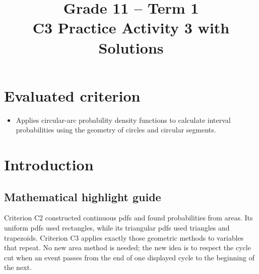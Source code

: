 
\title{Grade 11 -- Term 1 \\ C3 Practice Activity 3 with Solutions}
\author{}
\date{}


	\maketitle
	\setcounter{tocdepth}{1}
	\setcounter{secnumdepth}{2}
	\label{toc}
	\tableofcontents
	
	\section*{Evaluated criterion}
	\begin{itemize}
		\item [\textbf{C3}] Applies circular-arc probability density functions to calculate interval probabilities using the geometry of circles and circular segments.
	\end{itemize}
	
	\section{Introduction}\label{sec:c3-introduction}
\subsection*{Mathematical highlight guide}
\label{tone:C3:legend}

	\vspace{8mm}
	
	Criterion C2 constructed continuous pdfs and found probabilities from areas.
	Its uniform pdfs used rectangles, while its triangular pdfs used triangles and
	trapezoids.  Criterion C3 applies exactly those geometric methods to variables
	that repeat.  No new area method is needed; the new idea is to respect the
	cycle cut when an event passes from the end of one displayed cycle to the
	beginning of the next.
	
